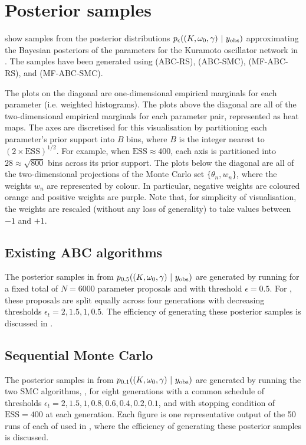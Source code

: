 \documentclass[supplement,review]{siamonline190516}
\begin{document}
\section{Posterior samples}
show samples from the posterior distributions $p_\epsilon((K, \omega_0, \gamma)~|~y_{\mathrm{obs}})$ approximating the Bayesian posteriors of the parameters for the Kuramoto oscillator network in .
The samples have been generated using  (ABC-RS),  (ABC-SMC),  (MF-ABC-RS), and  (MF-ABC-SMC).

The plots on the diagonal are one-dimensional empirical marginals for each parameter (i.e. weighted histograms).
The plots above the diagonal are all of the two-dimensional empirical marginals for each parameter pair, represented as heat maps.
The axes are discretised for this visualisation by partitioning each parameter's prior support into $B$ bins, where $B$ is the integer nearest to $(2 \times \mathrm{ESS})^{1/2}$.
For example, when $\mathrm{ESS} \approx 400$, each axis is partitioned into $28 \approx \sqrt{800}$ bins across its prior support.
The plots below the diagonal are all of the two-dimensional projections of the Monte Carlo set $\{ \theta_n, w_n \}$, where the weights $w_n$ are represented by colour.
In particular, negative weights are coloured orange and positive weights are purple.
Note that, for simplicity of visualisation, the weights are rescaled (without any loss of generality) to take values between $-1$ and $+1$.

\subsection{Existing ABC algorithms}
The posterior samples in  from $p_{0.5}((K, \omega_0, \gamma)~|~y_{\mathrm{obs}})$ are generated by running  for a fixed total of $N=6000$ parameter proposals and with threshold $\epsilon = 0.5$. 
For , these proposals are split equally across four generations with decreasing thresholds $\epsilon_t = 2, 1.5, 1, 0.5$. 
The efficiency of generating these posterior samples is discussed in .

\subsection{Sequential Monte Carlo}
The posterior samples in  from $p_{0.1}((K, \omega_0, \gamma)~|~y_{\mathrm{obs}})$ are generated by running the two SMC algorithms, , for eight generations with a common schedule of thresholds $\epsilon_t = 2, 1.5, 1, 0.8, 0.6, 0.4, 0.2, 0.1$, and with stopping condition of $\mathrm{ESS}=400$ at each generation.
Each figure is one representative output of the 50 runs of each of  used in , where the efficiency of generating these posterior samples is discussed.
\end{document}

